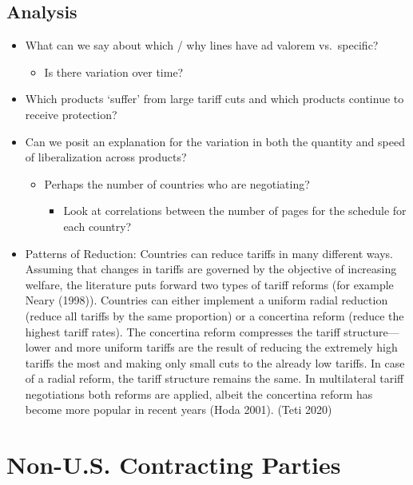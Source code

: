 \documentclass[
  12pt,
]{article}
\providecommand{\tightlist}{%
  \setlength{\itemsep}{0pt}\setlength{\parskip}{0pt}}
\begin{document}
\hypertarget{analysis}{%
\subsection{Analysis}\label{analysis}}

\begin{itemize}
\item
  What can we say about which / why lines have ad valorem vs.~specific?

  \begin{itemize}
  \tightlist
  \item
    Is there variation over time?
  \end{itemize}
\item
  Which products `suffer' from large tariff cuts and which products continue to receive protection?
\item
  Can we posit an explanation for the variation in both the quantity and speed of liberalization across products?

  \begin{itemize}
  \item
    Perhaps the number of countries who are negotiating?

    \begin{itemize}
    \tightlist
    \item
      Look at correlations between the number of pages for the schedule for each country?
    \end{itemize}
  \end{itemize}
\item
  Patterns of Reduction: Countries can reduce tariffs in many different ways. Assuming that changes in tariffs are governed by the objective of increasing welfare, the literature puts forward two types of tariff reforms (for example Neary (1998)). Countries can either implement a uniform radial reduction (reduce all tariffs by the same proportion) or a concertina reform (reduce the highest tariff rates). The concertina reform compresses the tariff structure---lower and more uniform tariffs are the result of reducing the extremely high tariffs the most and making only small cuts to the already low tariffs. In case of a radial reform, the tariff structure remains the same. In multilateral tariff negotiations both reforms are applied, albeit the concertina reform has become more popular in recent years (Hoda 2001). (Teti 2020)
\end{itemize}

\hypertarget{non-u.s.-contracting-parties}{%
\section{Non-U.S. Contracting Parties}\label{non-u.s.-contracting-parties}}
\end{document}
